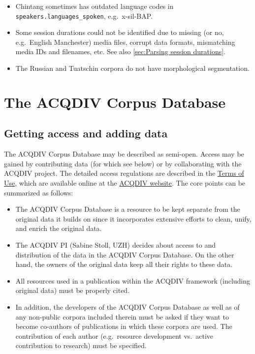\documentclass[a4paper, 11pt]{book}
\begin{document}
\begin{itemize}
\item Chintang sometimes has outdated language codes in \texttt{speakers.languages\_spoken}, e.g.\  x-sil-BAP.

\item Some session durations could not be identified due to missing (or no, e.g.\ English Manchester) media files, corrupt data formats, mismatching media IDs and filenames, etc. See also \autoref{sec:Parsing session durations}.

\item The Russian and Tuatschin corpora do not have morphological segmentation.

\end{itemize}



\chapter{The ACQDIV Corpus Database}
\label{cha:Details of the corpus}

\section{Getting access and adding data}
\label{sec:Access to the corpus}

The ACQDIV Corpus Database may be described as semi-open. Access may be gained by contributing data (for which see below) or by collaborating with the ACQDIV project. The detailed access regulations are described in the \href{http://www.acqdiv.uzh.ch/dam/jcr:c7318751-f531-43a8-9dbd-b48eee950a4c/terms_of_use_for_the_acqdiv_corpus.pdf}{Terms of Use}, which are available online at the \href{http://www.acqdiv.uzh.ch/en/resources.html}{ACQDIV website}. The core points can be summarized as follows: 

\begin{itemize}
	\item The ACQDIV Corpus Database is a resource to be kept separate from the original data it builds on since it incorporates extensive efforts to clean, unify, and enrich the original data.
	\item The ACQDIV PI (Sabine Stoll, UZH) decides about access to and distribution of the data in the ACQDIV Corpus Database. On the other hand, the owners of the original data keep all their rights to these data. 
	\item All resources used in a publication within the ACQDIV framework (including original data) must be properly cited.
	\item In addition, the developers of the ACQDIV Corpus Database as well as of any non-public corpora included therein must be asked if they want to become co-authors of publications in which these corpora are used. The contribution of each author (e.g.\ resource development vs.\ active contribution to research) must be specified. 
\end{itemize}
\end{document}
